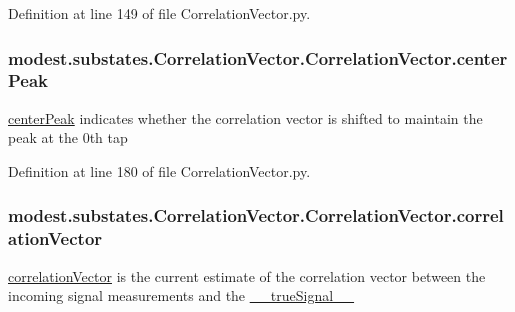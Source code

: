 Definition at line 149 of file Correlation\+Vector.\+py.

\subsubsection[{\texorpdfstring{center\+Peak}{centerPeak}}]{\setlength{\rightskip}{0pt plus 5cm}modest.\+substates.\+Correlation\+Vector.\+Correlation\+Vector.\+center\+Peak}\hypertarget{classmodest_1_1substates_1_1CorrelationVector_1_1CorrelationVector_ad98b9e809e03a82b0e0d89ea37a97352}{}\label{classmodest_1_1substates_1_1CorrelationVector_1_1CorrelationVector_ad98b9e809e03a82b0e0d89ea37a97352}


\hyperlink{classmodest_1_1substates_1_1CorrelationVector_1_1CorrelationVector_ad98b9e809e03a82b0e0d89ea37a97352}{center\+Peak} indicates whether the correlation vector is shifted to maintain the peak at the 0th tap 



Definition at line 180 of file Correlation\+Vector.\+py.

\subsubsection[{\texorpdfstring{correlation\+Vector}{correlationVector}}]{\setlength{\rightskip}{0pt plus 5cm}modest.\+substates.\+Correlation\+Vector.\+Correlation\+Vector.\+correlation\+Vector}\hypertarget{classmodest_1_1substates_1_1CorrelationVector_1_1CorrelationVector_a79191f74fabdb5dbea025f2bf3c4c2b2}{}\label{classmodest_1_1substates_1_1CorrelationVector_1_1CorrelationVector_a79191f74fabdb5dbea025f2bf3c4c2b2}


\hyperlink{classmodest_1_1substates_1_1CorrelationVector_1_1CorrelationVector_a79191f74fabdb5dbea025f2bf3c4c2b2}{correlation\+Vector} is the current estimate of the correlation vector between the incoming signal measurements and the \hyperlink{classmodest_1_1substates_1_1CorrelationVector_1_1CorrelationVector_a40f65c10e255c043d8f56d17d152e705}{\+\_\+\+\_\+true\+Signal\+\_\+\+\_\+} 



